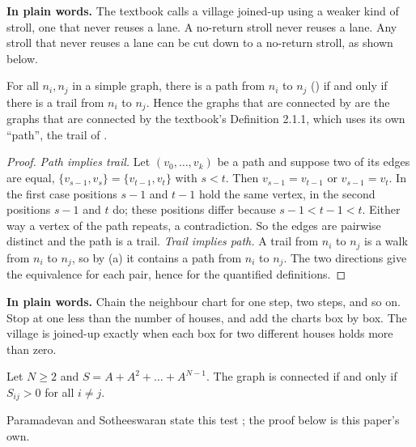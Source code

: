 \plainstart\textbf{In plain words.} The textbook calls a village joined-up using a weaker kind of stroll, one that never reuses a lane. A no-return stroll never reuses a lane. Any stroll that never reuses a lane can be cut down to a no-return stroll, as shown below.\plainend
\begin{proposition}\label{prop:same}
For all $n_i, n_j$ in a simple graph, there is a path from $n_i$ to $n_j$ () if and only if there is a trail from $n_i$ to $n_j$. Hence the graphs that are connected by  are the graphs that are connected by the textbook's Definition 2.1.1, which uses its own ``path'', the trail of .
\end{proposition}

\begin{proof}
\emph{Path implies trail.} Let $(v_0, \dots, v_k)$ be a path and suppose two of its edges are equal, $\{v_{s-1}, v_s\} = \{v_{t-1}, v_t\}$ with $s < t$. Then $v_{s-1} = v_{t-1}$ or $v_{s-1} = v_t$. In the first case positions $s-1$ and $t-1$ hold the same vertex, in the second positions $s-1$ and $t$ do; these positions differ because $s - 1 < t - 1 < t$. Either way a vertex of the path repeats, a contradiction. So the edges are pairwise distinct and the path is a trail. \emph{Trail implies path.} A trail from $n_i$ to $n_j$ is a walk from $n_i$ to $n_j$, so by (a) it contains a path from $n_i$ to $n_j$. The two directions give the equivalence for each pair, hence for the quantified definitions.
\end{proof}

\plainstart\textbf{In plain words.} Chain the neighbour chart for one step, two steps, and so on. Stop at one less than the number of houses, and add the charts box by box. The village is joined-up exactly when each box for two different houses holds more than zero.\plainend
\begin{theorem}\label{thm:test}
Let $N \ge 2$ and $S = A + A^2 + \dots + A^{N-1}$. The graph is connected if and only if $S_{ij} > 0$ for all $i \ne j$.
\end{theorem}

Paramadevan and Sotheeswaran state this test \cite[Theorem 2, p.~17]{paramadevan2021adjacency}; the proof below is this paper's own.

